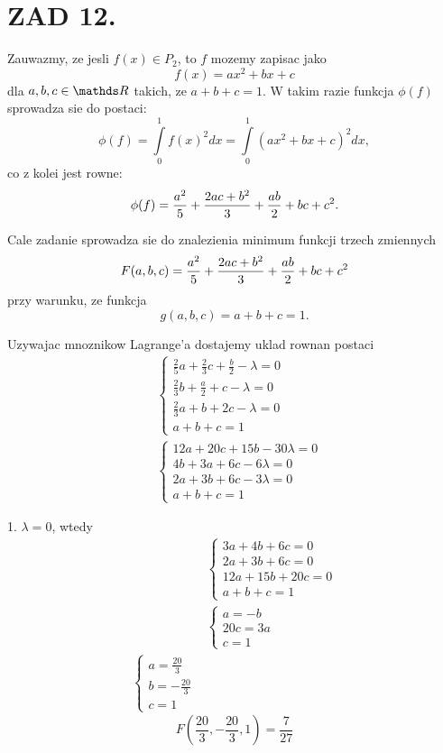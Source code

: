 \documentclass{article}[13pt]
\begin{document}
    \section*{ZAD 12.}

    Zauwazmy, ze jesli $f(x)\in P_2$, to $f$ mozemy zapisac jako
    $$f(x)=ax^2+bx+c$$
    dla $a,b,c\in\R$ takich, ze $a+b+c=1$. W takim razie funkcja $\phi(f)$ sprowadza sie do postaci:
    $$\phi(f)=\int\limits_0^1f(x)^2dx=\int\limits_0^1(ax^2+bx+c)^2dx,$$
    co z kolei jest rowne:
    $$\phi(f)={a^2\over5}+{2ac+b^2\over3}+{ab\over2}+bc+c^2.$$

    Cale zadanie sprowadza sie do znalezienia minimum funkcji trzech zmiennych
    $$F(a,b,c)={a^2\over5}+{2ac+b^2\over3}+{ab\over2}+bc+c^2$$
    przy warunku, ze funkcja
    $$g(a,b,c)=a+b+c=1.$$

    Uzywajac mnoznikow Lagrange'a dostajemy uklad rownan postaci
    \begin{align*}
        &\begin{cases}
            \frac25a+\frac23c+\frac b2-\lambda=0\\
            \frac23b+\frac a2+c-\lambda=0\\
            \frac23a+b+2c-\lambda=0\\
            a+b+c=1
        \end{cases}\\
        &\begin{cases}
            12a+20c+15b-30\lambda=0\\
            4b+3a+6c-6\lambda=0\\
            2a+3b+6c-3\lambda=0\\
            a+b+c=1
        \end{cases}
    \end{align*}

    {\color{def}1. $\lambda=0$}, wtedy
    \begin{align*}
        &\begin{cases}
            3a+4b+6c=0\\
            2a+3b+6c=0\\
            12a+15b+20c=0\\
            a+b+c=1
        \end{cases}\\
        &\begin{cases}
            a=-b\\
            20c=3a\\
            c=1
        \end{cases}\\
        \begin{cases}
            a=\frac{20}3\\
            b=-\frac{20}3\\
            c=1
        \end{cases}
    \end{align*}
        $$F(\frac{20}3,-\frac{20}3,1)=\frac7{27}$$
\end{document}
